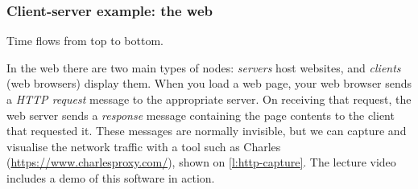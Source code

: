 \begin{frame}
    \label{s:client-server}
    \frametitle{Client-server example: the web}
    Time flows from top to bottom.
    \begin{center}
    \end{center}
\end{frame}

In the web there are two main types of nodes: \emph{servers} host websites, and \emph{clients} (web browsers) display them.
When you load a web page, your web browser sends a \emph{HTTP request} message to the appropriate server.
On receiving that request, the web server sends a \emph{response} message containing the page contents to the client that requested it.
These messages are normally invisible, but we can capture and visualise the network traffic with a tool such as Charles (\url{https://www.charlesproxy.com/}), shown on \autoref{l:http-capture}.
The lecture video includes a demo of this software in action.

\begin{frame}[plain]
    \label{s:http-capture}
\end{frame}
\label{l:http-capture}

